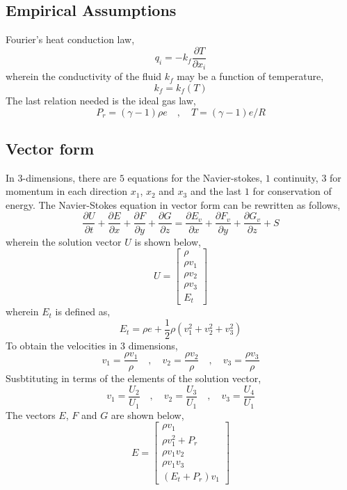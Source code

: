 \documentclass[a4paper, 12pt]{report}
\begin{document}
\begin{center}
\subsection{Empirical Assumptions}
\begin{comment}
\end{comment}
Fourier's heat conduction law,
$$q_{i} = -k_{f}\frac{\partial T}{\partial x_{i}}$$
wherein the conductivity of the fluid $k_{f}$ may be a function of temperature,
$$k_{f} = k_{f}(T)$$
The last relation needed is the ideal gas law,
$$P_{r} = (\gamma-1)\rho e\quad,\quad T = (\gamma-1)e/R$$

\subsection{Vector form}
\begin{comment}
\end{comment}
In $3$-dimensions, there are $5$ equations for the Navier-stokes, $1$ continuity, $3$ for momentum in each direction $x_{1}$, $x_{2}$ and $x_{3}$ and the last $1$ for conservation of energy. The Navier-Stokes equation in vector form can be rewritten as follows,
$$\frac{\partial U}{\partial t} + \frac{\partial E}{\partial x} + \frac{\partial F}{\partial y} + \frac{\partial G}{\partial z} = \frac{\partial E_{v}}{\partial x} + \frac{\partial F_{v}}{\partial y} + \frac{\partial G_{v}}{\partial z} + S$$
wherein the solution vector $U$ is shown below,
$$U = \begin{bmatrix}
\rho \\ \rho v_{1} \\ \rho v_{2} \\ \rho v_{3} \\ E_{t}
\end{bmatrix}$$
wherein $E_{t}$ is defined as,
$$E_{t} = \rho e + \frac{1}{2}\rho(v_{1}^{2}+v_{2}^{2}+v_{3}^{2})$$
To obtain the velocities in $3$ dimensions, 
$$v_{1} = \frac{\rho v_{1}}{\rho} \quad,\quad v_{2} = \frac{\rho v_{2}}{\rho} \quad,\quad v_{3} = \frac{\rho v_{3}}{\rho}$$
Susbtituting in terms of the elements of the solution vector,
$$v_{1} = \frac{U_{2}}{U_{1}} \quad,\quad v_{2} = \frac{U_{3}}{U_{1}} \quad,\quad v_{3} = \frac{U_{4}}{U_{1}}$$
The vectors $E$, $F$ and $G$ are shown below,
$$E = \begin{bmatrix}
\rho v_{1} \\ \rho v_{1}^{2} + P_{r} \\ \rho v_{1}v_{2} \\ \rho v_{1}v_{3} \\ (E_{t}+P_{r})v_{1}

\end{bmatrix}$$
\end{center}
\end{document}
